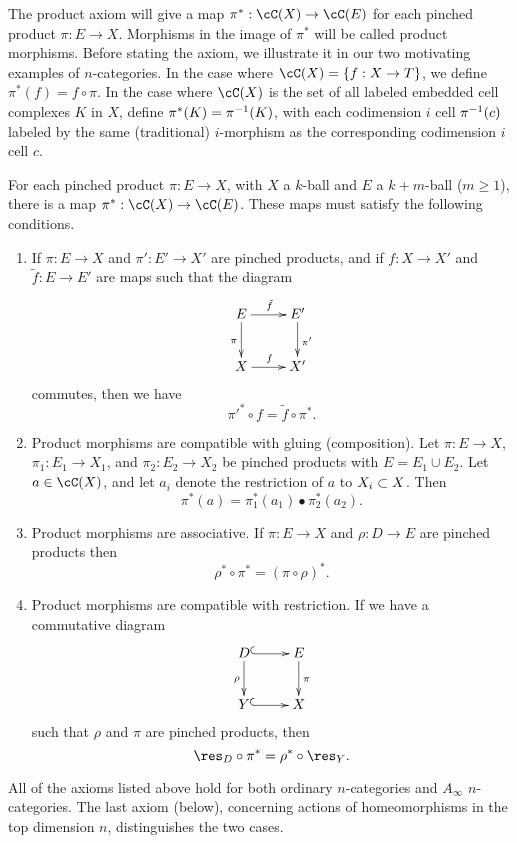 The product axiom will give a map $\pi^*:\cC(X)\to \cC(E)$ for each pinched product
$\pi:E\to X$.
Morphisms in the image of $\pi^*$ will be called product morphisms.
Before stating the axiom, we illustrate it in our two motivating examples of $n$-categories.
In the case where $\cC(X) = \{f: X\to T\}$, we define $\pi^*(f) = f\circ\pi$.
In the case where $\cC(X)$ is the set of all labeled embedded cell complexes $K$ in $X$, 
define $\pi^*(K) = \pi^{-1}(K)$, with each codimension $i$ cell $\pi^{-1}(c)$ labeled by the
same (traditional) $i$-morphism as the corresponding codimension $i$ cell $c$.


\begin{axiom}
\label{axiom:product}
For each pinched product $\pi:E\to X$, with $X$ a $k$-ball and $E$ a $k{+}m$-ball ($m\ge 1$),
there is a map $\pi^*:\cC(X)\to \cC(E)$.
These maps must satisfy the following conditions.
\begin{enumerate}
\item
If $\pi:E\to X$ and $\pi':E'\to X'$ are pinched products, and
if $f:X\to X'$ and $\tilde{f}:E \to E'$ are maps such that the diagram
\[ \xymatrix{
	E \ar[r]^{\tilde{f}} \ar[d]_{\pi} & E' \ar[d]^{\pi'} \\
	X \ar[r]^{f} & X'
} \]
commutes, then we have 
\[
	\pi'^*\circ f = \tilde{f}\circ \pi^*.
\]
\item
Product morphisms are compatible with gluing (composition).
Let $\pi:E\to X$, $\pi_1:E_1\to X_1$, and $\pi_2:E_2\to X_2$ 
be pinched products with $E = E_1\cup E_2$.
Let $a\in \cC(X)$, and let $a_i$ denote the restriction of $a$ to $X_i\subset X$.
Then 
\[
	\pi^*(a) = \pi_1^*(a_1)\bullet \pi_2^*(a_2) .
\]
\item
Product morphisms are associative.
If $\pi:E\to X$ and $\rho:D\to E$ are pinched products then
\[
	\rho^*\circ\pi^* = (\pi\circ\rho)^* .
\]
\item
Product morphisms are compatible with restriction.
If we have a commutative diagram
\[ \xymatrix{
	D \ar@{^(->}[r] \ar[d]_{\rho} & E \ar[d]^{\pi} \\
	Y \ar@{^(->}[r] & X
} \]
such that $\rho$ and $\pi$ are pinched products, then
\[
	\res_D\circ\pi^* = \rho^*\circ\res_Y .
\]
\end{enumerate}
\end{axiom}


\medskip

All of the axioms listed above hold for both ordinary $n$-categories and $A_\infty$ $n$-categories.
The last axiom (below), concerning actions of 
homeomorphisms in the top dimension $n$, distinguishes the two cases.

